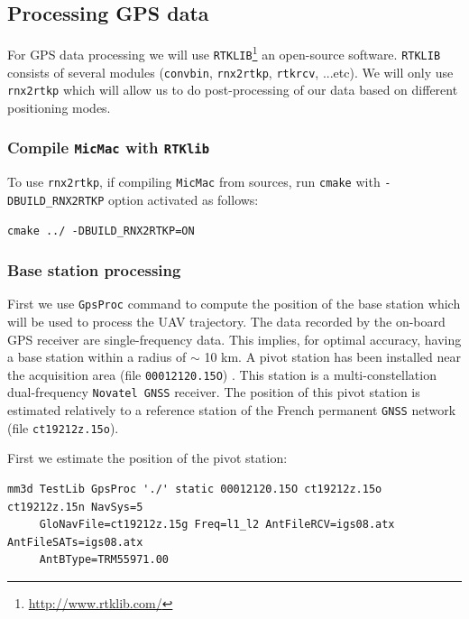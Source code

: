 \subsection{Processing GPS data}
For GPS data processing we will use {\tt RTKLIB}\footnote{\url{http://www.rtklib.com/}} an open-source software. {\tt RTKLIB} consists of several modules ({\tt convbin}, {\tt rnx2rtkp}, {\tt rtkrcv}, ...etc). We will only use {\tt rnx2rtkp} which will allow us to do post-processing of our data based on different positioning modes.

\subsubsection{Compile {\tt MicMac} with {\tt RTKlib}}
To use {\tt rnx2rtkp}, if compiling {\tt MicMac} from sources, run {\tt cmake} with {\tt -DBUILD\_RNX2RTKP} option activated as follows:

\begin{verbatim}
cmake ../ -DBUILD_RNX2RTKP=ON
\end{verbatim}

\subsubsection{Base station processing}\label{proc_pivot}
First we use {\tt GpsProc} command to compute the position of the base station which will be used to process the UAV trajectory. The data recorded by the on-board GPS receiver are single-frequency data. This implies, for optimal accuracy, having a base station within a radius of $\sim$ 10 km. A pivot station has been installed near the acquisition area (file {\tt 00012120.15O}) . This station is a multi-constellation dual-frequency {\tt Novatel GNSS} receiver. The position of this pivot station is estimated relatively to a reference station of the French permanent {\tt GNSS} network (file {\tt ct19212z.15o}).\newline

First we estimate the position of the pivot station:

\begin{verbatim}
mm3d TestLib GpsProc './' static 00012120.15O ct19212z.15o ct19212z.15n NavSys=5 
     GloNavFile=ct19212z.15g Freq=l1_l2 AntFileRCV=igs08.atx AntFileSATs=igs08.atx 
     AntBType=TRM55971.00
\end{verbatim}

